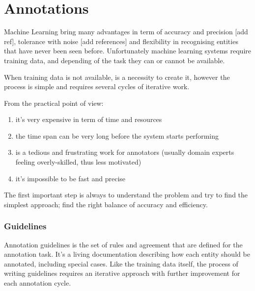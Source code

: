 \documentclass{article}
\begin{document}
\section{Annotations}

Machine Learning bring many advantages in term of accuracy and precision [add ref], tolerance with noise [add references] and flexibility in recognising entities that have never been seen before. 
Unfortunately machine learning systems require training data, and depending of the task they can or cannot be available.

When training data is not available, is a necessity to create it, however the process is simple and requires several cycles of iterative work.

From the practical point of view:  
\begin{enumerate}
    \item it's very expensive in term of time and resources
    \item the time span can be very long before the system starts performing
    \item is a tedious and frustrating work for annotators (usually domain experts feeling overly-skilled, thus less motivated)
    \item it's impossible to be fast and precise 
\end{enumerate}
    
The first important step is always to understand the problem and try to find the simplest approach; find the right balance of accuracy and efficiency. 

\subsubsection{Guidelines}

Annotation guidelines is the set of rules and agreement that are defined for the annotation task. It's a living documentation describing how each entity should be annotated, including special cases. 
Like the training data itself, the process of writing guidelines requires an iterative approach with further improvement for each annotation cycle. 
\end{document}
